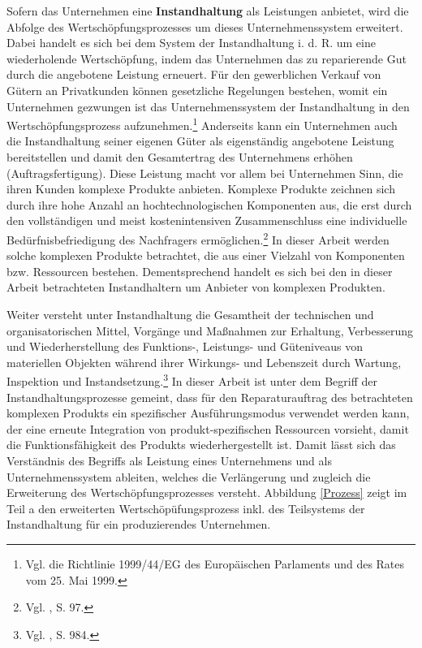 Sofern das Unternehmen eine \textbf{Instandhaltung} als Leistungen anbietet, wird die Abfolge des Wertschöpfungsprozesses um dieses Unternehmenssystem erweitert. Dabei handelt es sich bei dem System der Instandhaltung i. d. R. um eine wiederholende Wertschöpfung, indem das Unternehmen das zu reparierende Gut durch die angebotene Leistung erneuert. Für den gewerblichen Verkauf von Gütern an Privatkunden können gesetzliche Regelungen bestehen, womit ein Unternehmen gezwungen ist das Unternehmenssystem der Instandhaltung in den Wertschöpfungsprozess aufzunehmen.\footnote{Vgl. die Richtlinie 1999/44/EG des Europäischen Parlaments und des Rates vom 25. Mai 1999.} Anderseits kann ein Unternehmen auch die Instandhaltung seiner eigenen Güter als eigenständig angebotene Leistung bereitstellen und damit den Gesamtertrag des Unternehmens erhöhen (Auftragsfertigung). Diese Leistung macht vor allem bei Unternehmen Sinn, die ihren Kunden komplexe Produkte anbieten. Komplexe Produkte zeichnen sich durch ihre hohe Anzahl an hochtechnologischen Komponenten aus, die erst durch den vollständigen und meist kostenintensiven Zusammenschluss eine individuelle Bedürfnisbefriedigung des Nachfragers ermöglichen.\footnote{Vgl. \cite{komplexe2009Schmidt}, S. 97.} In dieser Arbeit werden solche komplexen Produkte betrachtet, die aus einer Vielzahl von Komponenten bzw. Ressourcen bestehen. Dementsprechend handelt es sich bei den in dieser Arbeit betrachteten Instandhaltern um Anbieter von komplexen Produkten. 

Weiter versteht \citeauthor{helbing2010instandhaltung} unter Instandhaltung die \glqq Gesamtheit der technischen und organisatorischen Mittel, Vorgänge und Maßnahmen zur Erhaltung, Verbesserung und Wiederherstellung des Funktions-, Leistungs- und Güteniveaus von materiellen Objekten während ihrer Wirkungs- und Lebenszeit durch Wartung, Inspektion und Instandsetzung.\grqq\footnote{Vgl. \citeauthor{helbing2010instandhaltung}, S. 984.} In dieser Arbeit ist unter dem Begriff der Instandhaltungsprozesse gemeint, dass für den Reparaturauftrag des betrachteten komplexen Produkts ein spezifischer Ausführungsmodus verwendet werden kann, der eine erneute Integration von produkt-spezifischen Ressourcen vorsieht, damit die Funktionsfähigkeit des Produkts wiederhergestellt ist. Damit lässt sich das Verständnis des Begriffs als Leistung eines Unternehmens und als Unternehmenssystem ableiten, welches die Verlängerung und zugleich die Erweiterung des Wertschöpfungsprozesses versteht. Abbildung \ref{Prozess} zeigt im Teil a den erweiterten Wertschöpüfungsprozess inkl. des Teilsystems der Instandhaltung für ein produzierendes Unternehmen.

